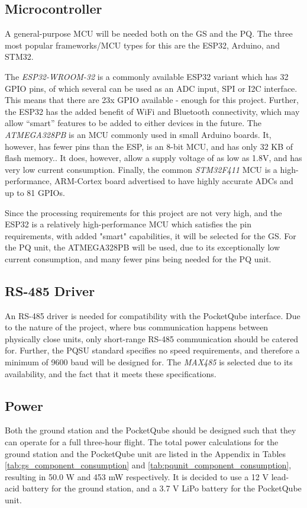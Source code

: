 \subsection{Microcontroller}
A general-purpose MCU will be needed both on the GS and the PQ. The three most popular frameworks/MCU types for this are the ESP32, Arduino, and STM32.

The \textit{ESP32-WROOM-32} is a commonly available ESP32 variant which has 32 GPIO pins, of which several can be used as an ADC input, SPI or I2C interface. This means that there are 23x GPIO available - enough for this project. Further, the ESP32 has the added benefit of WiFi and Bluetooth connectivity, which may allow “smart” features to be added to either devices in the future. The \textit{ATMEGA328PB} is an MCU commonly used in small Arduino boards. It, however, has fewer pins than the ESP, is an 8-bit MCU, and has only 32 KB of flash memory.. It does, however, allow a supply voltage of as low as 1.8V, and has very low current consumption. Finally, the common \textit{STM32F411} MCU is a high-performance, ARM-Cortex board advertised to have highly accurate ADCs and up to 81 GPIOs.

Since the processing requirements for this project are not very high, and the ESP32 is a relatively high-performance MCU which satisfies the pin requirements, with added "smart" capabilities, it will be selected for the GS. For the PQ unit, the ATMEGA328PB will be used, due to its exceptionally low current consumption, and many fewer pins being needed for the PQ unit.

\subsection{RS-485 Driver}
An RS-485 driver is needed for compatibility with the PocketQube interface. Due to the nature of the project, where bus communication happens between physically close units, only short-range RS-485 communication should be catered for. Further, the PQSU standard specifies no speed requirements, and therefore a minimum of 9600 baud will be designed for. The \textit{MAX485} is selected due to its availability, and the fact that it meets these specifications.

\subsection{Power}
Both the ground station and the PocketQube should be designed such that they can operate for a full three-hour flight. The total power calculations for the ground station and the PocketQube unit are listed in the Appendix in Tables \ref{tab:gs_component_consumption} and \ref{tab:pqunit_component_consumption}, resulting in 50.0 W and 453 mW respectively. It is decided to use a 12 V lead-acid battery for the ground station, and a 3.7 V LiPo battery for the PocketQube unit.

